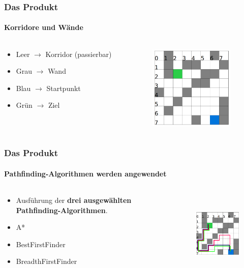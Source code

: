 \documentclass[professionalfont,serif,german]{beamer}
\begin{document}
\begin{frame}
  \frametitle{Das Produkt}
  \framesubtitle{Korridore und Wände}
  \begin{columns}
    \begin{column}[T]{0.5\textwidth}
      \begin{itemize}
        \item Leer $\rightarrow$ Korridor (passierbar)
        \item Grau $\rightarrow$ Wand
        \item Blau $\rightarrow$ Startpunkt
        \item Grün $\rightarrow$ Ziel
      \end{itemize}
    \end{column}
    \begin{column}[T]{0.5\textwidth}
      \begin{figure}
        \includegraphics[height=4cm]{img/grid2.png}
      \end{figure}
    \end{column}
  \end{columns}
\end{frame}

\begin{frame}
  \frametitle{Das Produkt}
  \framesubtitle{Pathfinding-Algorithmen werden angewendet}
  \begin{columns}
    \begin{column}[T]{0.5\textwidth}
      \begin{itemize}
        \item Ausführung der \textbf{drei ausgewählten Pathfinding-Algorithmen}.
        \item \textcolor{pfblue}{A*}
        \item \textcolor{pfred}{BestFirstFinder}
        \item \textcolor{pfgreen}{BreadthFirstFinder}
      \end{itemize}
    \end{column}
    \begin{column}[T]{0.5\textwidth}
      \begin{figure}
        \includegraphics[height=4cm]{img/grid3.png}
      \end{figure}
    \end{column}
  \end{columns}
\end{frame}
\end{document}
